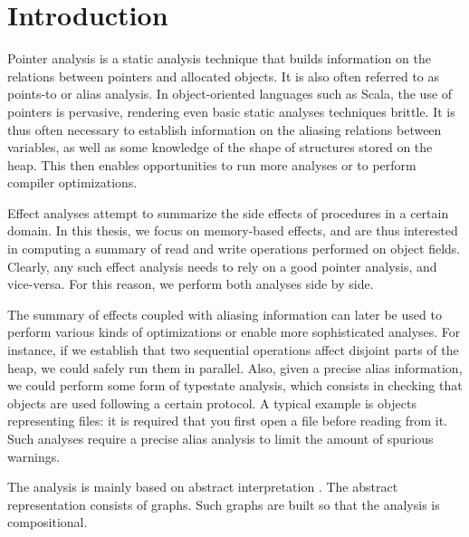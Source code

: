 \chapter{Introduction} \label{chap:intro}
Pointer analysis is a static analysis technique that builds information on the
relations between pointers and allocated objects. It is also often referred to
as points-to or alias analysis.
In object-oriented languages such as Scala, the use of pointers is
pervasive, rendering even basic static analyses techniques brittle. It is
thus often necessary to establish information on the aliasing relations between
variables, as well as some knowledge of the shape of structures stored on the
heap. This then enables opportunities to run more analyses or to perform
compiler optimizations.

Effect analyses attempt to summarize the side effects of procedures in a certain
domain. In this thesis, we focus on memory-based effects, and are thus interested
in computing a summary of read and write operations performed on object fields.
Clearly, any such effect analysis needs to rely on a good pointer analysis,
and vice-versa. For this reason, we perform both analyses side by side.

The summary of effects coupled with aliasing information can later be used to
perform various kinds of optimizations or enable more sophisticated analyses.
For instance, if we establish that two sequential operations affect disjoint
parts of the heap, we could safely run them in parallel. Also, given a precise
alias information, we could perform some form of typestate analysis, which
consists in checking that objects are used following a certain protocol. A
typical example is objects representing files: it is required that you first
open a file before reading from it. Such analyses require a precise alias
analysis to limit the amount of spurious warnings.

The analysis is mainly based on abstract interpretation
\cite{DBLP:conf/popl/CousotC77,DBLP:conf/popl/CousotC02}. The abstract
representation consists of graphs. Such graphs are built so that the analysis
is compositional.

